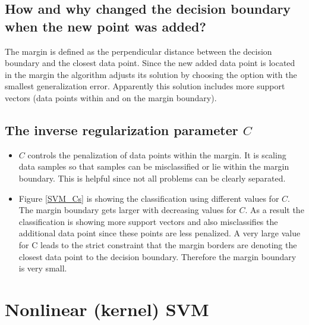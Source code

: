 \documentclass{article}
\begin{document}
\subsection{How and why changed the decision boundary when the new point was added?}

The margin is defined as the perpendicular distance between the decision boundary and the closest data point. Since the new added data point is located in the margin the algorithm adjusts its solution by choosing the option with the smallest generalization error. Apparently this solution includes more support vectors (data points within and on the margin boundary).

\subsection{The inverse regularization parameter $C$}

\begin{itemize}

	\item $C$ controls the penalization of data points within the margin. It is scaling data samples so that samples can be misclassified or lie within the margin boundary. This is helpful since not all problems can be clearly separated.

	\item Figure \ref{SVM_Cs} is showing the classification using different values for $C$. The margin boundary gets larger with decreasing values for $C$. As a result the classification is showing more support vectors and also misclassifies the additional data point since these points are less penalized.
	    A very large value for C leads to the strict constraint that the margin borders are denoting the closest data point to the decision boundary. Therefore the margin boundary is very small.

\end{itemize}


\section{Nonlinear (kernel) SVM}

\subsection{}

\subsection{}
\end{document}
